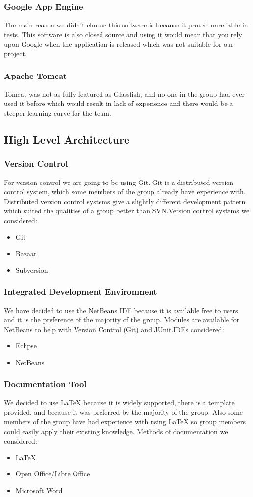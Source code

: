 \documentclass[titlepage]{article}
\begin{document}
\subsubsection{Google App Engine}
The main reason we didn't choose this software is because it proved unreliable in tests. This software is also closed source and using it would mean that you rely upon Google when the application is released which was not suitable for our project.
\subsubsection{Apache Tomcat}Tomcat was not as fully featured as Glassfish, and no one in the group had ever used it before which would result in lack of experience and there would be a steeper learning curve for the team.
\subsection{High Level Architecture}
\subsubsection{Version Control}For version control we are going to be using Git. Git is a distributed version control system, which some members of the group already have experience with. Distributed version control systems give a slightly different development pattern which suited the qualities of a group better than SVN.Version control systems we considered:
\begin{itemize}	
\item{Git}	
\item{Bazaar}	
\item{Subversion}
\end{itemize}
\subsubsection{Integrated Development Environment}
We have decided to use the NetBeans IDE because it is available free to users and it is the preference of the majority of the group. Modules are available for NetBeans to help with Version Control (Git) and JUnit.IDEs considered:
\begin{itemize}	
\item{Eclipse}	
\item{NetBeans
}\end{itemize}
\subsubsection{Documentation Tool}We decided to use \LaTeX{} because it is widely supported, there is a template provided, and because it was preferred by the majority of the group. Also some members of the group have had experience with using  \LaTeX{} so group members could easily apply their existing knowledge. Methods of documentation we considered:
\begin{itemize}	
\item{\LaTeX{}}	
\item{Open Office/Libre Office}	
\item{Microsoft Word}
\end{itemize}
\end{document}
